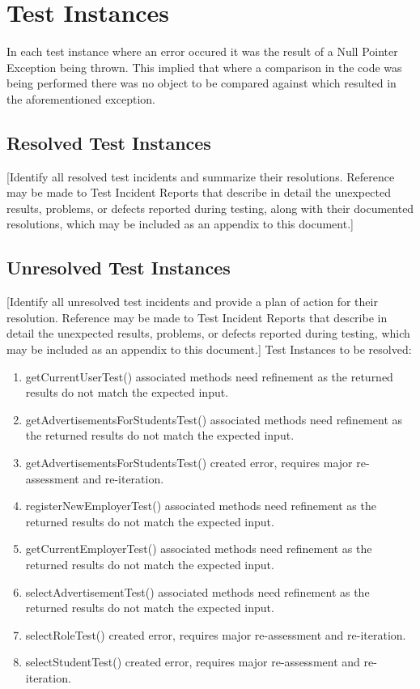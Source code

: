 \documentclass{l3deliverable}
\begin{document}
\section{Test Instances}
In each test instance where an error occured it was the result of a Null Pointer Exception being thrown. This implied that where a comparison in the code was being performed there was no object to be compared against which resulted in the aforementioned exception. 

\subsection{Resolved Test Instances}
[Identify all resolved test incidents and summarize their resolutions.  Reference may be made to Test Incident Reports that describe in detail the unexpected results, problems, or defects reported during testing, along with their documented resolutions, which may be included as an appendix to this document.]

\subsection{Unresolved Test Instances}
[Identify all unresolved test incidents and provide a plan of action for their resolution.  Reference may be made to Test Incident Reports that describe in detail the unexpected results, problems, or defects reported during testing, which may be included as an appendix to this document.]
Test Instances to be resolved:

\begin{enumerate} 
\item getCurrentUserTest() associated methods need refinement as the returned results do not match the expected input.
\item getAdvertisementsForStudentsTest() associated methods need refinement as the returned results do not match the expected input.
\item getAdvertisementsForStudentsTest() created error, requires major re-assessment and re-iteration.
\item registerNewEmployerTest() associated methods need refinement as the returned results do not match the expected input.
\item getCurrentEmployerTest() associated methods need refinement as the returned results do not match the expected input.
\item selectAdvertisementTest() associated methods need refinement as the returned results do not match the expected input.
\item selectRoleTest() created error, requires major re-assessment and re-iteration.
\item selectStudentTest() created error, requires major re-assessment and re-iteration.
\end{enumerate}
\end{document}
